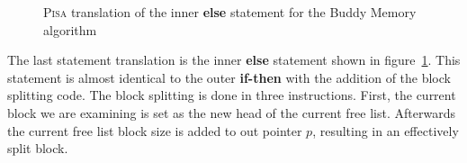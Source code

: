 \begin{figure}[ht]
    \centering
    \begin{subfigure}{.4\textwidth}
          
    \end{subfigure}%
    \begin{subfigure}{.5\textwidth}
        \centering
    \end{subfigure}
    \caption{\textsc{Pisa} translation of the inner \textbf{else} statement for the Buddy Memory algorithm}
    \label{fig:pisa-buddy-inner-else}
\end{figure}

The last statement translation is the inner \textbf{else} statement shown in figure~\ref{fig:pisa-buddy-inner-else}. This statement is almost identical to the outer \textbf{if-then} with the addition of the block splitting code. The block splitting is done in three instructions. First, the current block we are examining is set as the new head of the current free list. Afterwards the current free list block size is added to out pointer $p$, resulting in an effectively split block.

